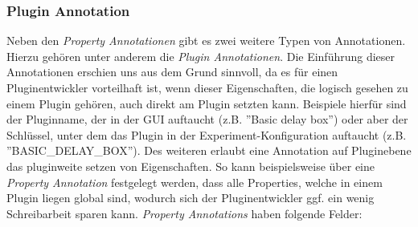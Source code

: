 \documentclass[a4paper, 11pt]{article} %
\begin{document}
\subsubsection{Plugin Annotation} %
\label{ssub:plugin_annotation}
Neben den \emph{Property Annotationen} gibt es zwei weitere Typen von Annotationen. Hierzu gehören unter anderem die \emph{Plugin Annotationen}. Die Einführung dieser Annotationen erschien uns aus dem Grund sinnvoll, da es für einen Pluginentwickler vorteilhaft ist, wenn dieser Eigenschaften, die logisch gesehen zu einem Plugin gehören, auch direkt am Plugin setzten kann. Beispiele hierfür sind der Pluginname, der in der GUI auftaucht (z.B. ''Basic delay box'') oder aber der Schlüssel, unter dem das Plugin in der Experiment-Konfiguration auftaucht (z.B. ''BASIC\_DELAY\_BOX''). Des weiteren erlaubt eine Annotation auf Pluginebene das pluginweite setzen von Eigenschaften. So kann beispielsweise über eine \emph{Property Annotation} festgelegt werden, dass alle Properties, welche in einem Plugin liegen global sind, wodurch sich der Pluginentwickler ggf. ein wenig Schreibarbeit sparen kann. \emph{Property Annotations} haben folgende Felder:
\end{document}
